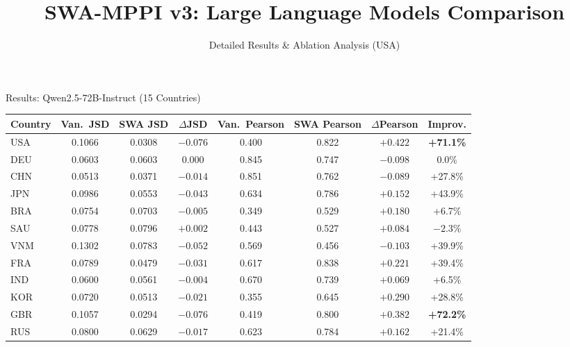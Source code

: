 \documentclass[11pt, aspectratio=169]{beamer}
\title{SWA-MPPI v3: Large Language Models Comparison}
\subtitle{Detailed Results \& Ablation Analysis (USA)}
\begin{document}
{ 
\begin{frame}
    \titlepage
\end{frame}
}

\begin{frame}{Results: Qwen2.5-72B-Instruct (15 Countries)}

\begin{table}
\centering
\scriptsize
\renewcommand{\arraystretch}{1.05}
\begin{tabular}{@{}l cc c cc c c@{}}
\toprule
\textbf{Country} & \textbf{Van.\ JSD} & \textbf{SWA JSD} & \textbf{$\Delta$JSD} & \textbf{Van.\ Pearson} & \textbf{SWA Pearson} & \textbf{$\Delta$Pearson} & \textbf{Improv.} \\
\midrule
\rowcolor{lightgray}
USA & 0.1066 & 0.0308 & $-0.076$ & 0.400 & 0.822 & $+0.422$ & \textcolor{cbGreen}{\textbf{+71.1\%}} \\
DEU & 0.0603 & 0.0603 & $0.000$ & 0.845 & 0.747 & $-0.098$ & $0.0\%$ \\
CHN & 0.0513 & 0.0371 & $-0.014$ & 0.851 & 0.762 & $-0.089$ & \textcolor{cbGreen}{+27.8\%} \\
JPN & 0.0986 & 0.0553 & $-0.043$ & 0.634 & 0.786 & $+0.152$ & \textcolor{cbGreen}{+43.9\%} \\
BRA & 0.0754 & 0.0703 & $-0.005$ & 0.349 & 0.529 & $+0.180$ & \textcolor{cbGreen}{+6.7\%} \\
SAU & 0.0778 & 0.0796 & \textcolor{alertred}{$+0.002$} & 0.443 & 0.527 & $+0.084$ & \textcolor{alertred}{$-2.3\%$} \\
VNM & 0.1302 & 0.0783 & $-0.052$ & 0.569 & 0.456 & $-0.103$ & \textcolor{cbGreen}{+39.9\%} \\
FRA & 0.0789 & 0.0479 & $-0.031$ & 0.617 & 0.838 & $+0.221$ & \textcolor{cbGreen}{+39.4\%} \\
IND & 0.0600 & 0.0561 & $-0.004$ & 0.670 & 0.739 & $+0.069$ & \textcolor{cbGreen}{+6.5\%} \\
KOR & 0.0720 & 0.0513 & $-0.021$ & 0.355 & 0.645 & $+0.290$ & \textcolor{cbGreen}{+28.8\%} \\
\rowcolor{lightgray}
GBR & 0.1057 & 0.0294 & $-0.076$ & 0.419 & 0.800 & $+0.382$ & \textcolor{cbGreen}{\textbf{+72.2\%}} \\
RUS & 0.0800 & 0.0629 & $-0.017$ & 0.623 & 0.784 & $+0.162$ & \textcolor{cbGreen}{+21.4\%} \\

\end{tabular}
\end{table}
\end{frame}
\end{document}
